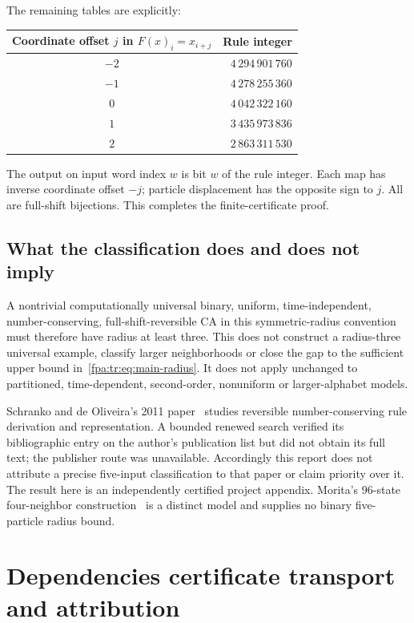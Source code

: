 \documentclass[11pt,a4paper]{article}
\numberwithin{equation}{section}
\begin{document}
The remaining tables are explicitly:
\begin{center}
\begin{tabular}{cr}\toprule
Coordinate offset $j$ in $F(x)_i=x_{i+j}$ & Rule integer\\\midrule
$-2$ & $4\,294\,901\,760$\\
$-1$ & $4\,278\,255\,360$\\
$0$ & $4\,042\,322\,160$\\
$1$ & $3\,435\,973\,836$\\
$2$ & $2\,863\,311\,530$\\\bottomrule
\end{tabular}
\end{center}
The output on input word index $w$ is bit $w$ of the rule integer. Each map has inverse coordinate offset $-j$; particle displacement has the opposite sign to $j$. All are full-shift bijections. This completes the finite-certificate proof.

\subsection{What the classification does and does not imply}
A nontrivial computationally universal binary, uniform, time-independent, number-conserving, full-shift-reversible CA in this symmetric-radius convention must therefore have radius at least three. This does not construct a radius-three universal example, classify larger neighborhoods or close the gap to the sufficient upper bound in~\eqref{fpa:tr:eq:main-radius}. It does not apply unchanged to partitioned, time-dependent, second-order, nonuniform or larger-alphabet models.

Schranko and de Oliveira's 2011 paper~\cite{fpa:tr:schranko} studies reversible number-conserving rule derivation and representation. A bounded renewed search verified its bibliographic entry on the author's publication list but did not obtain its full text; the publisher route was unavailable. Accordingly this report does not attribute a precise five-input classification to that paper or claim priority over it. The result here is an independently certified project appendix. Morita's 96-state four-neighbor construction~\cite{fpa:morita2012} is a distinct model and supplies no binary five-particle radius bound.
\section{Dependencies certificate transport and attribution}\label{fpa:tr:sec:scope}
\end{document}
